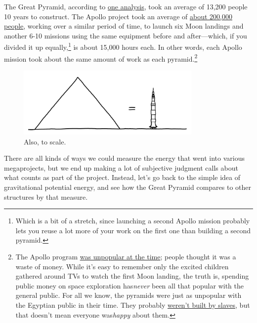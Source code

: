 {{The Great Pyramid, according to \href{http://web.archive.org/web/20070608101037/http://www.pubs.asce.org/ceonline/0699feat.html}{one analysis}, took an average of 13,200 people 10 years to construct. The Apollo project took an average of \href{http://history.nasa.gov/SP-4012v1.pdf}{about 200,000 people}, working over a similar period of time, to launch six Moon landings and another 6-10 missions using the same equipment before and after—which, if you divided it up equally,{\footnote{Which is a bit of a stretch, since launching a second Apollo mission probably lets you reuse a lot more of your work on the first one than building a second pyramid.} } is about 15,000 hours each. In other words, each Apollo mission took about the same amount of work as each pyramid.{\footnote{The Apollo program \href{http://www.theatlantic.com/technology/archive/2012/09/moondoggle-the-forgotten-opposition-to-the-apollo-program/262254/}{was unpopular at the time}; people thought it was a waste of money. While it's easy to remember only the excited children gathered around TVs to watch the first Moon landing, the truth is, spending public money on space exploration has\emph{never} been all that popular with the general public. For all we know, the pyramids were just as unpopular with the Egyptian public in their time. They probably \href{http://harvardmagazine.com/2003/07/who-built-the-pyramids-html} {weren't built by slaves}, but that doesn't mean everyone was\emph{happy} about them.} } }

\begin{figure}[!htbp]
\centering
\includegraphics[scale=0.5, max width=0.8\textwidth]{imgs/a/95/pyramid_equal.png}
\caption{Also, to scale.}
\end{figure}

{There are all kinds of ways we could measure the energy that went into various megaprojects, but we end up making a lot of subjective judgment calls about what counts as part of the project. Instead, let's go back to the simple idea of gravitational potential energy, and see how the Great Pyramid compares to other structures by that measure.}

}
